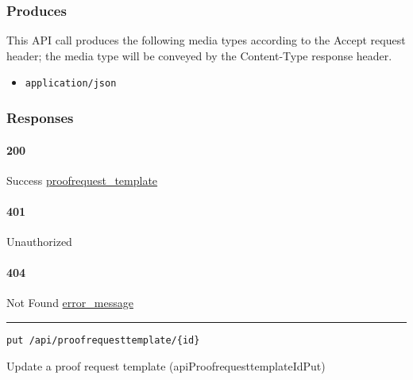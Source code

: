 \hypertarget{produces-104}{%
\subsubsection{Produces}\label{produces-104}}

This API call produces the following media types according to the
{Accept} request header; the media type will be conveyed by the
{Content-Type} response header.

\begin{itemize}
\tightlist
\item
  \texttt{application/json}
\end{itemize}

\hypertarget{responses-106}{%
\subsubsection{Responses}\label{responses-106}}

\hypertarget{section-348}{%
\paragraph{200}\label{section-348}}

Success
\protect\hyperlink{proofrequest_template}{proofrequest\_template}

\hypertarget{section-349}{%
\paragraph{401}\label{section-349}}

Unauthorized \protect\hyperlink{}{}

\hypertarget{section-350}{%
\paragraph{404}\label{section-350}}

Not Found \protect\hyperlink{error_message}{error\_message}

\begin{center}\rule{0.5\linewidth}{\linethickness}\end{center}

\protect\hypertarget{apiProofrequesttemplateIdPut}{}{}

\begin{verbatim}
put /api/proofrequesttemplate/{id}
\end{verbatim}

Update a proof request template ({apiProofrequesttemplateIdPut})


